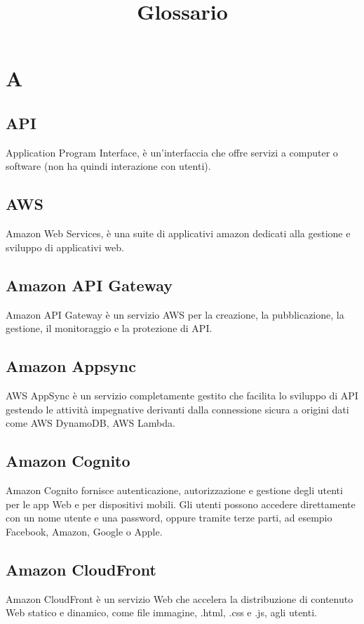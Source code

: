 \documentclass{classes/base}
\title{Glossario}
\author{\giulio}
\begin{document}
	\maketitle
	\newpage
	\tableofcontents

    \section{A}
        \subsection*{API}
        Application Program Interface, è un'interfaccia che offre servizi a computer o software (non ha quindi interazione con utenti).
       
        \subsection*{AWS}
        \label{sec:AWS}
        Amazon Web Services, è una suite di applicativi amazon dedicati alla gestione e sviluppo di applicativi web.

        \subsection*{Amazon API Gateway}
        Amazon API Gateway è un servizio AWS per la creazione, la pubblicazione, la gestione, il monitoraggio e la protezione di API.

        \subsection*{Amazon Appsync}
        AWS AppSync è un servizio completamente gestito che facilita lo sviluppo di API gestendo le attività impegnative derivanti dalla connessione sicura a origini dati come AWS DynamoDB, AWS Lambda.

        \subsection*{Amazon Cognito}
        Amazon Cognito fornisce autenticazione, autorizzazione e gestione degli utenti per le app Web e per dispositivi mobili. Gli utenti possono accedere direttamente con un nome utente e una password, oppure tramite terze parti, ad esempio Facebook, Amazon, Google o Apple.
        
        \subsection*{Amazon CloudFront}
        Amazon CloudFront è un servizio Web che accelera la distribuzione di contenuto Web statico e dinamico, come file immagine, .html, .css e .js, agli utenti.
\end{document}
